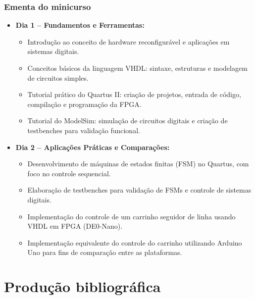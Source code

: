 \documentclass[aspectratio=169]{beamer}
\begin{document}
\begin{frame}
	\frametitle{Ementa do minicurso}
	
	
\begin{itemize}
	\item \textbf{Dia 1 – Fundamentos e Ferramentas:}
	\begin{itemize}
		\item Introdução ao conceito de hardware reconfigurável e aplicações em sistemas digitais.
		\item Conceitos básicos da linguagem VHDL: sintaxe, estruturas e modelagem de circuitos simples.
		\item Tutorial prático do Quartus II: criação de projetos, entrada de código, compilação e programação da FPGA.
		\item Tutorial do ModelSim: simulação de circuitos digitais e criação de testbenches para validação funcional.
	\end{itemize}
	
	\item \textbf{Dia 2 – Aplicações Práticas e Comparações:}
	\begin{itemize}
		\item Desenvolvimento de máquinas de estados finitas (FSM) no Quartus, com foco no controle sequencial.
		\item Elaboração de testbenches para validação de FSMs e controle de sistemas digitais.
		\item Implementação do controle de um carrinho seguidor de linha usando VHDL em FPGA (DE0-Nano).
		\item Implementação equivalente do controle do carrinho utilizando Arduino Uno para fins de comparação entre as plataformas.
	\end{itemize}
\end{itemize}

	
\end{frame}

\section{Produção bibliográfica}
\end{document}
